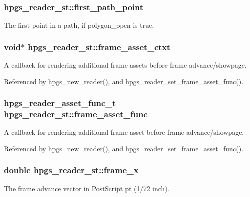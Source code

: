 \subsubsection[{first\_\-path\_\-point}]{ {\bf hpgs\_\-reader\_\-st::first\_\-path\_\-point}}\label{structhpgs__reader__st_ae2dd059b9b389ea689fbfb0b7229c837}
The first point in a path, if {\ttfamily polygon\_\-open} is true. 
\subsubsection[{frame\_\-asset\_\-ctxt}]{\setlength{\rightskip}{0pt plus 5cm}void$\ast$ {\bf hpgs\_\-reader\_\-st::frame\_\-asset\_\-ctxt}}\label{structhpgs__reader__st_a6750637d9d21d8e91d9bd3fe4fbd22f2}
A callback for rendering additional frame assets before frame advance/showpage. 

Referenced by hpgs\_\-new\_\-reader(), and hpgs\_\-reader\_\-set\_\-frame\_\-asset\_\-func().

\subsubsection[{frame\_\-asset\_\-func}]{\setlength{\rightskip}{0pt plus 5cm}hpgs\_\-reader\_\-asset\_\-func\_\-t {\bf hpgs\_\-reader\_\-st::frame\_\-asset\_\-func}}\label{structhpgs__reader__st_a00151e4215b46b4053a089cc95aa5f69}
A callback for rendering additional frame asset before frame advance/showpage. 

Referenced by hpgs\_\-new\_\-reader(), and hpgs\_\-reader\_\-set\_\-frame\_\-asset\_\-func().

\subsubsection[{frame\_\-x}]{\setlength{\rightskip}{0pt plus 5cm}double {\bf hpgs\_\-reader\_\-st::frame\_\-x}}\label{structhpgs__reader__st_a9b94337c22f1c37b911af05cae026bd3}
The frame advance vector in PostScript pt (1/72 inch). 
